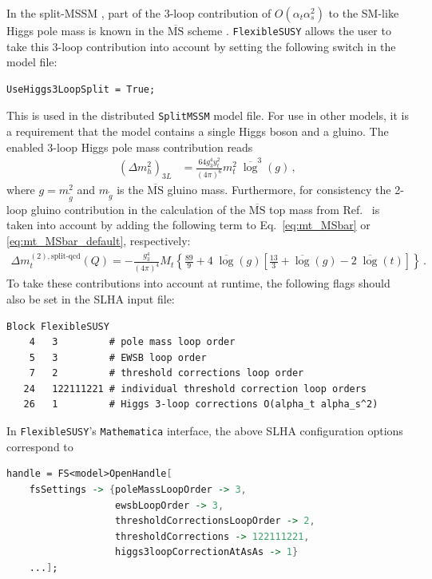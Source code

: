 \documentclass[final,3p,11pt,pdflatex]{elsarticle}
\makeatletter
\newcommand{\modelname}[1]{\texttt{#1}\@\xspace}
\newcommand{\fs}{\texttt{FlexibleSUSY}\@\xspace}
\newcommand{\mathematica}{\texttt{Ma\-the\-ma\-ti\-ca}\xspace}
\newcommand{\ol}[1]{\overline{#1}}
\newcommand{\MSbar}{\ensuremath{\ol{\text{MS}}}\xspace}
\newcommand{\barlog}{\overline{\log}}
\def\at{\alpha_t}
\def\as{\alpha_s}
\makeatother
\begin{document}
In the split-MSSM \cite{Bagnaschi:2014rsa}, part of the 3-loop
contribution of $O(\at \as^2)$
to the SM-like Higgs pole mass is known in the \MSbar
scheme \cite{Benakli:2013msa}.  \fs allows the user to take this
3-loop contribution into account by setting the following switch in
the model file:
%
\begin{lstlisting}
UseHiggs3LoopSplit = True;
\end{lstlisting}
%
This is used in the distributed \modelname{SplitMSSM} model file. For use in
other models, it is a requirement that the model contains a single
Higgs boson and a gluino.  The enabled 3-loop Higgs pole mass
contribution reads
%
\begin{align}
  (\Delta m_h^2)_{3L} &= \frac{64 g_3^4 y_t^2}{(4\pi)^6} m_t^2\;\barlog^3(g) \,,
\end{align}
%
where $g = m_{\tilde{g}}^2$ and $m_{\tilde{g}}$ is the \MSbar gluino
mass.  Furthermore, for consistency the 2-loop gluino contribution in
the calculation of the \MSbar top mass from Ref.\
\cite{Benakli:2013msa} is taken into account by adding the following
term to Eq.\ \eqref{eq:mt_MSbar} or \eqref{eq:mt_MSbar_default},
respectively:
%
\begin{align}
  \Delta m_t^{(2),\text{split-qcd}}(Q) =
  -\frac{g_3^4}{(4\pi)^4} M_t \left\{
     \frac{89}{9}
     + 4\;\barlog(g) \left[
        \frac{13}{3}
        + \barlog(g)
        - 2\;\barlog(t)
     \right]
  \right\} \,.
\end{align}
%
To take these contributions into account at runtime, the following flags
should also be set in the SLHA input file:
%
\begin{lstlisting}
Block FlexibleSUSY
    4   3         # pole mass loop order
    5   3         # EWSB loop order
    7   2         # threshold corrections loop order
   24   122111221 # individual threshold correction loop orders
   26   1         # Higgs 3-loop corrections O(alpha_t alpha_s^2)
\end{lstlisting}
%
In \fs's \mathematica interface, the above SLHA configuration options
correspond to
%
\\\begin{minipage}{\linewidth}
\begin{lstlisting}[language=Mathematica]
handle = FS<model>OpenHandle[
    fsSettings -> {poleMassLoopOrder -> 3,
                   ewsbLoopOrder -> 3,
                   thresholdCorrectionsLoopOrder -> 2,
                   thresholdCorrections -> 122111221,
                   higgs3loopCorrectionAtAsAs -> 1}
    ...];
\end{lstlisting}
\end{minipage}
\end{document}
